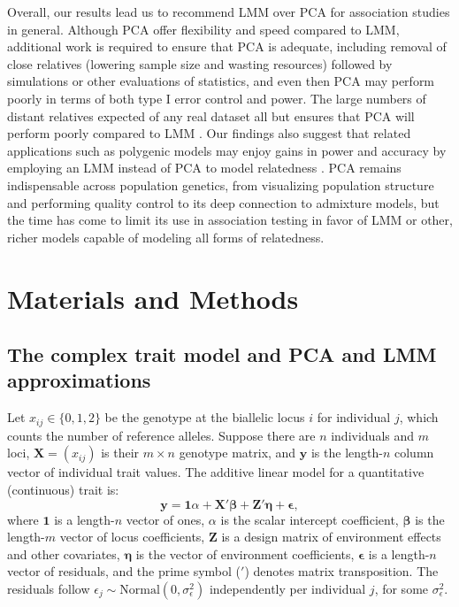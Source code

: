 \documentclass[9pt,lineno]{elife}
\newcommand{\xij}[1][j]{x_{i#1}}
\begin{document}
Overall, our results lead us to recommend LMM over PCA for association studies in general.
Although PCA offer flexibility and speed compared to LMM, additional work is required to ensure that PCA is adequate, including removal of close relatives (lowering sample size and wasting resources) followed by simulations or other evaluations of statistics, and even then PCA may perform poorly in terms of both type I error control and power.
The large numbers of distant relatives expected of any real dataset all but ensures that PCA will perform poorly compared to LMM \citep{henn_cryptic_2012, shchur_number_2018, loh_mixed-model_2018}.
Our findings also suggest that related applications such as polygenic models may enjoy gains in power and accuracy by employing an LMM instead of PCA to model relatedness \citep{rakitsch_lasso_2013,qian_fast_2020}.
PCA remains indispensable across population genetics, from visualizing population structure and performing quality control to its deep connection to admixture models, but the time has come to limit its use in association testing in favor of LMM or other, richer models capable of modeling all forms of relatedness.

\section{Materials and Methods}

\subsection{The complex trait model and PCA and LMM approximations}

Let $\xij \in \{ 0, 1, 2 \}$ be the genotype at the biallelic locus $i$ for individual $j$, which counts the number of reference alleles.
Suppose there are $n$ individuals and $m$ loci,
$\mathbf{X} = ( \xij )$ is their $m \times n$ genotype matrix, and
$\mathbf{y}$ is the length-$n$ column vector of individual trait values.
The additive linear model for a quantitative (continuous) trait is:
\begin{equation}
  \label{eq:trait}
  \mathbf{y}
  =
  \mathbf{1} \alpha + \mathbf{X}' \boldsymbol{\beta} + \mathbf{Z}' \boldsymbol{\eta} + \boldsymbol{\epsilon}
  ,
\end{equation}
where
$\mathbf{1}$ is a length-$n$ vector of ones,
$\alpha$ is the scalar intercept coefficient,
$\boldsymbol{\beta}$ is the length-$m$ vector of locus coefficients,
$\mathbf{Z}$ is a design matrix of environment effects and other covariates,
$\boldsymbol{\eta}$ is the vector of environment coefficients,
$\boldsymbol{\epsilon}$ is a length-$n$ vector of residuals,
and the prime symbol ($'$) denotes matrix transposition.
The residuals follow $\epsilon_j \sim \text{Normal}(0, \sigma^2_\epsilon)$ independently per individual $j$, for some $\sigma^2_\epsilon$.
\end{document}
